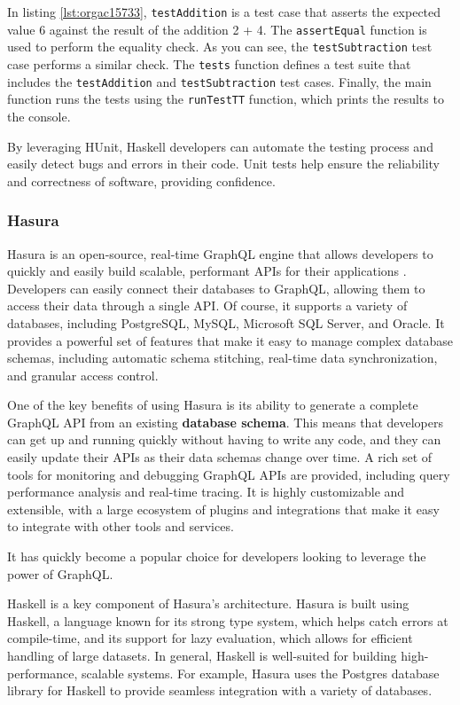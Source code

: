 \documentclass[a4paper, titlepage, twoside]{article}
\begin{document}
In listing \ref{lst:orgac15733}, \texttt{testAddition} is a test case that asserts the expected value 6 against the result of the addition 2 + 4. The \texttt{assertEqual} function is used to perform the equality check. As you can see, the \texttt{testSubtraction} test case performs a similar check. The \texttt{tests} function defines a test suite that includes the \texttt{testAddition} and \texttt{testSubtraction} test cases. Finally, the main function runs the tests using the \texttt{runTestTT} function, which prints the results to the console.

By leveraging HUnit, Haskell developers can automate the testing process and easily detect bugs and errors in their code. Unit tests help ensure the reliability and correctness of software, providing confidence.

\subsubsection{Hasura}
\label{sec:orga305ef5}

Hasura is an open-source, real-time GraphQL engine that allows developers to quickly and easily build scalable, performant APIs for their applications \autocite{hasuraInstantGraphQLAPIs}. Developers can easily connect their databases to GraphQL, allowing them to access their data through a single API. Of course, it supports a variety of databases, including PostgreSQL, MySQL, Microsoft SQL Server, and Oracle. It provides a powerful set of features that make it easy to manage complex database schemas, including automatic schema stitching, real-time data synchronization, and granular access control.

One of the key benefits of using Hasura is its ability to generate a complete GraphQL API from an existing \textbf{database schema}. This means that developers can get up and running quickly without having to write any code, and they can easily update their APIs as their data schemas change over time. A rich set of tools for monitoring and debugging GraphQL APIs are provided, including query performance analysis and real-time tracing. It is highly customizable and extensible, with a large ecosystem of plugins and integrations that make it easy to integrate with other tools and services.

It has quickly become a popular choice for developers looking to leverage the power of GraphQL.

Haskell is a key component of Hasura's architecture. Hasura is built using Haskell, a language known for its strong type system, which helps catch errors at compile-time, and its support for lazy evaluation, which allows for efficient handling of large datasets. In general, Haskell is well-suited for building high-performance, scalable systems. For example, Hasura uses the Postgres database library for Haskell to provide seamless integration with a variety of databases.
\end{document}
